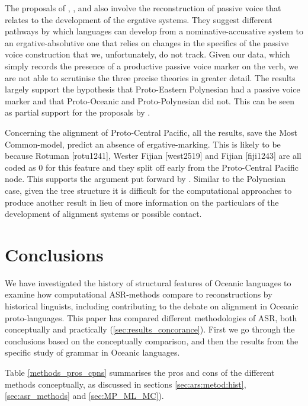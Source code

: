 \documentclass[12pt,letterpaper]{article}
\begin{document}
The proposals of \citet{hale_1968}, \citet{hohepa_1967, hohepa_1969}, and \citet{chung1978} also involve the reconstruction of passive voice that relates to the development of the ergative systems. They suggest different pathways by which languages can develop from a nominative-accusative system to an ergative-absolutive one that relies on changes in the specifics of the passive voice construction that we, unfortunately, do not track. Given our data, which simply records the presence of a productive passive voice marker on the verb, we are not able to scrutinise the three precise theories in greater detail. The results largely support the hypothesis that Proto-Eastern Polynesian had a passive voice marker and that Proto-Oceanic and Proto-Polynesian did not. This can be seen as partial support for the proposals by \citet{hale_1968, hohepa_1967, hohepa_1969, chung1978}.

Concerning the alignment of Proto-Central Pacific, all the results, save the Most Common-model, predict an absence of ergative-marking. This is likely to be because Rotuman [rotu1241], Wester Fijian [west2519] and Fijian [fiji1243] are all coded as 0 for this feature and they split off early from the Proto-Central Pacific node. This supports the argument put forward by \citet{ball2007ergativity}. Similar to the Polynesian case, given the tree structure it is difficult for the computational approaches to produce another result in lieu of more information on the particulars of the development of alignment systems or possible contact.

\FloatBarrier
\section{Conclusions}
We have investigated the history of structural features of Oceanic languages to examine how computational ASR-methods compare to reconstructions by historical linguists, including contributing to the debate on  alignment in Oceanic proto-languages. This paper has compared different methodologies of ASR, both conceptually and practically (\ref{sec:results_concorance}). First we go through the conclusions based on the conceptually comparison, and then the results from the specific study of grammar in Oceanic languages.

Table \ref{methods_pros_cpns} summarises the pros and cons of the different methods conceptually, as discussed in sections \ref{sec:ars:metod:hist}, \ref{sec:asr_methods} and \ref{sec:MP_ML_MC}).
\end{document}
